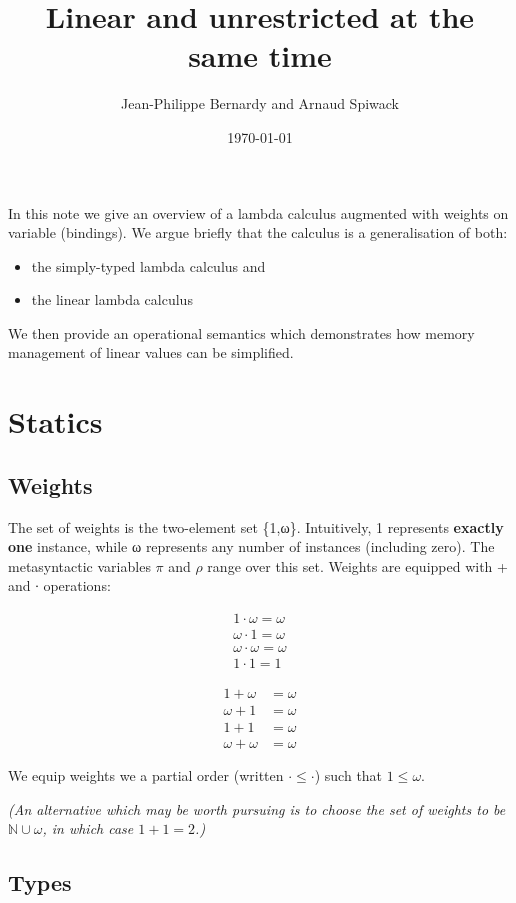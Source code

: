 \documentclass[11pt]{article}
\author{Jean-Philippe Bernardy and Arnaud Spiwack}
\date{\today}
\title{Linear and unrestricted at the same time}
\begin{document}
\maketitle
\tableofcontents

In this note we give an overview of a lambda calculus augmented with
weights on variable (bindings). We argue briefly that the calculus is
a generalisation of both:
\begin{itemize}
\item the simply-typed lambda calculus and
\item the linear lambda calculus
\end{itemize}

We then provide an operational semantics which demonstrates how memory
management of linear values can be simplified.

\section{Statics}
\label{sec:orgheadline8}
\subsection{Weights}
\label{sec:orgheadline1}

The set of weights is the two-element set \{1,ω\}. Intuitively, 1
represents \textbf{exactly one} instance, while ω represents any number of
instances (including zero).  The metasyntactic variables \(π\) and \(ρ\)
range over this set. Weights are equipped with + and ∙ operations:


\begin{align*}
1 · ω = ω \\
ω · 1 = ω \\
ω · ω = ω \\
1 · 1 = 1
\end{align*}

\begin{align*}
1 + ω &= ω \\
ω + 1 &= ω \\
1 + 1 &= ω \\
ω + ω &= ω
\end{align*}

We equip weights we a partial order (written \(· ≤ ·\)) such that \(1 ≤ ω\).

\emph{(An alternative which may be worth pursuing is to choose the set of
weights to be \(ℕ∪{ω}\), in which case \(1+1=2\).)}

\subsection{Types}
\label{sec:orgheadline2}
\end{document}
